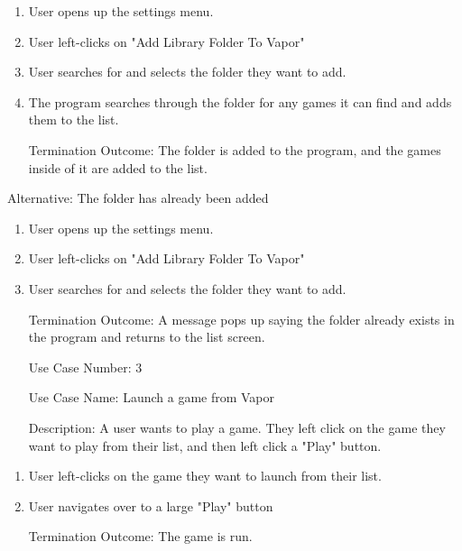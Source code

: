 \documentclass[10pt,conference,onecolumn,compsoc]{IEEEtran}
\begin{document}
\begin{enumerate}
\item User opens up the settings menu.
\item User left-clicks on "Add Library Folder To Vapor"
\item User searches for and selects the folder they want to add.
\item The program searches through the folder for any games it can find and adds them to the list.
\item[Termination Outcome:] The folder is added to the program, and the games inside of it are added to the list.
\end{enumerate}

Alternative: The folder has already been added
\begin{enumerate}
\item User opens up the settings menu.
\item User left-clicks on "Add Library Folder To Vapor"
\item User searches for and selects the folder they want to add.
\item[Termination Outcome:] A message pops up saying the folder already exists in the program and returns to the list screen.
\end{enumerate}

\begin{itemize}
\item[Use Case Number:] 3
\item[Use Case Name:] Launch a game from Vapor
\item[Description:] A user wants to play a game. They left click on the game they want to play from their list, and then left click a "Play" button.
\end{itemize}

\begin{enumerate}
\item User left-clicks on the game they want to launch from their list.
\item User navigates over to a large "Play" button
\item[Termination Outcome:] The game is run.
\end{enumerate}

%
%
%
\end{document}

